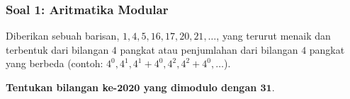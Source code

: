 \documentclass[english,t]{beamer}
\renewcommand{\emph}[1]{\textcolor{navyblue}{#1}}
\begin{document}
%
%

\begin{frame}
  \frametitle{Soal 1: Aritmatika Modular} 
Diberikan sebuah barisan, $1, 4, 5, 16, 17, 20, 21, \ldots$, yang terurut menaik dan terbentuk dari bilangan $4$ pangkat atau penjumlahan dari bilangan $4$ pangkat yang berbeda (contoh: $4^0, 4^1, 4^1 + 4^0, 4^2, 4^2 + 4^0, \ldots$).

\textbf{Tentukan bilangan ke-$\bm{2020}$ yang dimodulo dengan $\bm{31}$}.
\end{frame}
\end{document}
